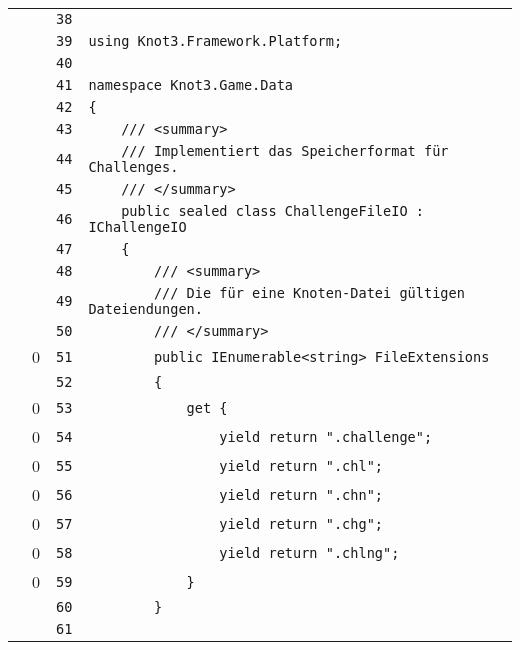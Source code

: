 \documentclass[a4paper,10pt]{article}
\begin{document}
\begin{longtable}[l]{lrrl}
\cellcolor{gray} &  & \verb~38~ & \verb~~\\
\cellcolor{gray} &  & \verb~39~ & \verb~using Knot3.Framework.Platform;~\\
\cellcolor{gray} &  & \verb~40~ & \verb~~\\
\cellcolor{gray} &  & \verb~41~ & \verb~namespace Knot3.Game.Data~\\
\cellcolor{gray} &  & \verb~42~ & \verb~{~\\
\cellcolor{gray} &  & \verb~43~ & \verb~    /// <summary>~\\
\cellcolor{gray} &  & \verb~44~ & \verb~    /// Implementiert das Speicherformat für Challenges.~\\
\cellcolor{gray} &  & \verb~45~ & \verb~    /// </summary>~\\
\cellcolor{gray} &  & \verb~46~ & \verb~    public sealed class ChallengeFileIO : IChallengeIO~\\
\cellcolor{gray} &  & \verb~47~ & \verb~    {~\\
\cellcolor{gray} &  & \verb~48~ & \verb~        /// <summary>~\\
\cellcolor{gray} &  & \verb~49~ & \verb~        /// Die für eine Knoten-Datei gültigen Dateiendungen.~\\
\cellcolor{gray} &  & \verb~50~ & \verb~        /// </summary>~\\
\cellcolor{red} & 0 & \verb~51~ & \verb~        public IEnumerable<string> FileExtensions~\\
\cellcolor{gray} &  & \verb~52~ & \verb~        {~\\
\cellcolor{red} & 0 & \verb~53~ & \verb~            get {~\\
\cellcolor{red} & 0 & \verb~54~ & \verb~                yield return ".challenge";~\\
\cellcolor{red} & 0 & \verb~55~ & \verb~                yield return ".chl";~\\
\cellcolor{red} & 0 & \verb~56~ & \verb~                yield return ".chn";~\\
\cellcolor{red} & 0 & \verb~57~ & \verb~                yield return ".chg";~\\
\cellcolor{red} & 0 & \verb~58~ & \verb~                yield return ".chlng";~\\
\cellcolor{red} & 0 & \verb~59~ & \verb~            }~\\
\cellcolor{gray} &  & \verb~60~ & \verb~        }~\\
\cellcolor{gray} &  & \verb~61~ & \verb~~\\

\end{longtable}
\end{document}
